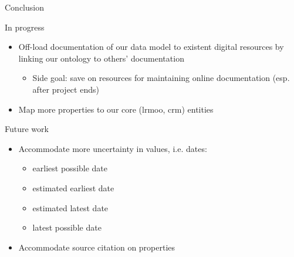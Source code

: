 \documentclass[xcolor=table]{beamer}
\begin{document}
\begin{frame}{Conclusion}


\vspace{1em}
\begin{block}{In progress}
    \begin{itemize}
        \item Off-load documentation of our data model to existent digital resources by linking our ontology to others' documentation
        \begin{itemize}
            \item Side goal: save on resources for maintaining online documentation (esp. after project ends)
        \end{itemize}
        \item Map more properties to our core (\ac{lrmoo}, \ac{crm}) entities
    \end{itemize}
\end{block}
\begin{block}{Future work}
    \begin{itemize}
        \item Accommodate more uncertainty in values, i.e. dates:
        \begin{itemize}
            \item earliest possible date
            \item estimated earliest date
            \item estimated latest date
            \item latest possible date
        \end{itemize}
        \item Accommodate source citation on properties
    \end{itemize}
\end{block}
\end{frame}
\end{document}
